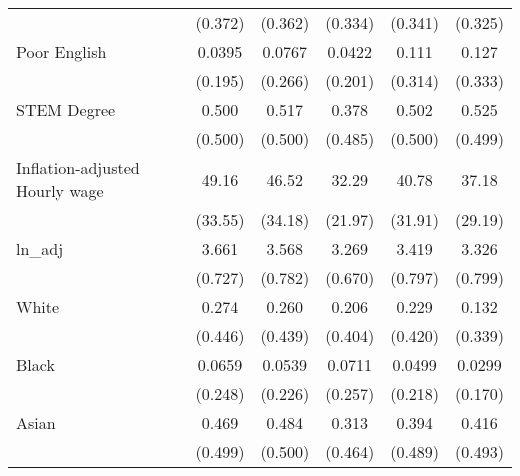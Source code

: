 \begin{table}[htbp]
\begin{tabular}{l*{5}{c}}
                    &     (0.372)         &     (0.362)         &     (0.334)         &     (0.341)         &     (0.325)         \\
[1em]
Poor English        &      0.0395         &      0.0767         &      0.0422         &       0.111         &       0.127         \\
                    &     (0.195)         &     (0.266)         &     (0.201)         &     (0.314)         &     (0.333)         \\
[1em]
STEM Degree         &       0.500         &       0.517         &       0.378         &       0.502         &       0.525         \\
                    &     (0.500)         &     (0.500)         &     (0.485)         &     (0.500)         &     (0.499)         \\
[1em]
Inflation-adjusted Hourly wage&       49.16         &       46.52         &       32.29         &       40.78         &       37.18         \\
                    &     (33.55)         &     (34.18)         &     (21.97)         &     (31.91)         &     (29.19)         \\
[1em]
ln\_adj              &       3.661         &       3.568         &       3.269         &       3.419         &       3.326         \\
                    &     (0.727)         &     (0.782)         &     (0.670)         &     (0.797)         &     (0.799)         \\
[1em]
White               &       0.274         &       0.260         &       0.206         &       0.229         &       0.132         \\
                    &     (0.446)         &     (0.439)         &     (0.404)         &     (0.420)         &     (0.339)         \\
[1em]
Black               &      0.0659         &      0.0539         &      0.0711         &      0.0499         &      0.0299         \\
                    &     (0.248)         &     (0.226)         &     (0.257)         &     (0.218)         &     (0.170)         \\
[1em]
Asian               &       0.469         &       0.484         &       0.313         &       0.394         &       0.416         \\
                    &     (0.499)         &     (0.500)         &     (0.464)         &     (0.489)         &     (0.493)         \\

\end{tabular}
\end{table}
